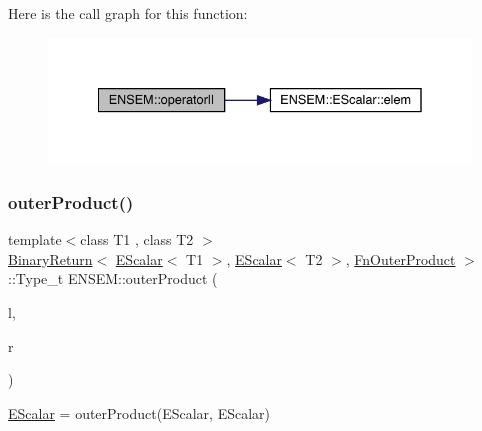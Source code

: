 Here is the call graph for this function\+:
\nopagebreak
\begin{figure}[H]
\begin{center}
\leavevmode
\includegraphics[width=335pt]{d4/dca/group__escalar_gadede5cc3683f39a01170f32e3f759c8e_cgraph}
\end{center}
\end{figure}
\mbox{\label{group__escalar_gaf54c1015e882e21da36323ae571504dc}} 
\subsubsection{\texorpdfstring{outerProduct()}{outerProduct()}}
{\footnotesize\ttfamily template$<$class T1 , class T2 $>$ \\
\mbox{\hyperlink{structENSEM_1_1BinaryReturn}{Binary\+Return}}$<$ \mbox{\hyperlink{classENSEM_1_1EScalar}{E\+Scalar}}$<$ T1 $>$, \mbox{\hyperlink{classENSEM_1_1EScalar}{E\+Scalar}}$<$ T2 $>$, \mbox{\hyperlink{structENSEM_1_1FnOuterProduct}{Fn\+Outer\+Product}} $>$\+::Type\+\_\+t E\+N\+S\+E\+M\+::outer\+Product (\begin{DoxyParamCaption}\item[{const \mbox{\hyperlink{classENSEM_1_1EScalar}{E\+Scalar}}$<$ T1 $>$ \&}]{l,  }\item[{const \mbox{\hyperlink{classENSEM_1_1EScalar}{E\+Scalar}}$<$ T2 $>$ \&}]{r }\end{DoxyParamCaption})\hspace{0.3cm}{\ttfamily [inline]}}



\mbox{\hyperlink{classENSEM_1_1EScalar}{E\+Scalar}} = outer\+Product(\+E\+Scalar, E\+Scalar) 

